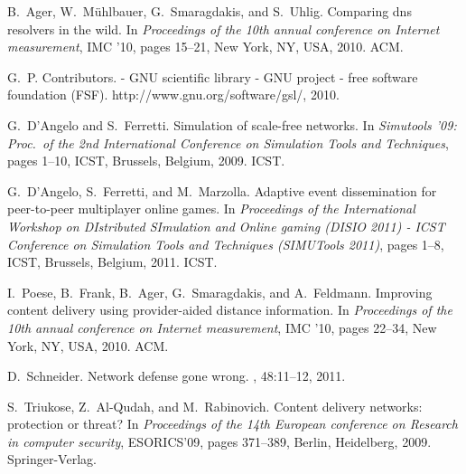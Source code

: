 \documentclass{IEEEtran}
\begin{document}
\begin{thebibliography}{1}

B.~Ager, W.~M\"{u}hlbauer, G.~Smaragdakis, and S.~Uhlig.
\newblock Comparing dns resolvers in the wild.
\newblock In {\em Proceedings of the 10th annual conference on Internet
  measurement}, IMC '10, pages 15--21, New York, NY, USA, 2010. ACM.

G.~P. Contributors.
 - {GNU} scientific library - {GNU} project - free software
  foundation {(FSF)}.
\newblock http://www.gnu.org/software/gsl/, 2010.

G.~D'Angelo and S.~Ferretti.
\newblock Simulation of scale-free networks.
\newblock In {\em Simutools '09: Proc.~of the 2nd International Conference on
  Simulation Tools and Techniques}, pages 1--10, ICST, Brussels, Belgium, 2009.
  ICST.

G.~D'Angelo, S.~Ferretti, and M.~Marzolla.
\newblock Adaptive event dissemination for peer-to-peer multiplayer online
  games.
\newblock In {\em Proceedings of the International Workshop on DIstributed
  SImulation and Online gaming (DISIO 2011) - ICST Conference on Simulation
  Tools and Techniques (SIMUTools 2011)}, pages 1--8, ICST, Brussels, Belgium,
  2011. ICST.

I.~Poese, B.~Frank, B.~Ager, G.~Smaragdakis, and A.~Feldmann.
\newblock Improving content delivery using provider-aided distance information.
\newblock In {\em Proceedings of the 10th annual conference on Internet
  measurement}, IMC '10, pages 22--34, New York, NY, USA, 2010. ACM.

D.~Schneider.
\newblock Network defense gone wrong.
, 48:11--12, 2011.

S.~Triukose, Z.~Al-Qudah, and M.~Rabinovich.
\newblock Content delivery networks: protection or threat?
\newblock In {\em Proceedings of the 14th European conference on Research in
  computer security}, ESORICS'09, pages 371--389, Berlin, Heidelberg, 2009.
  Springer-Verlag.

\end{thebibliography}
\end{document}
